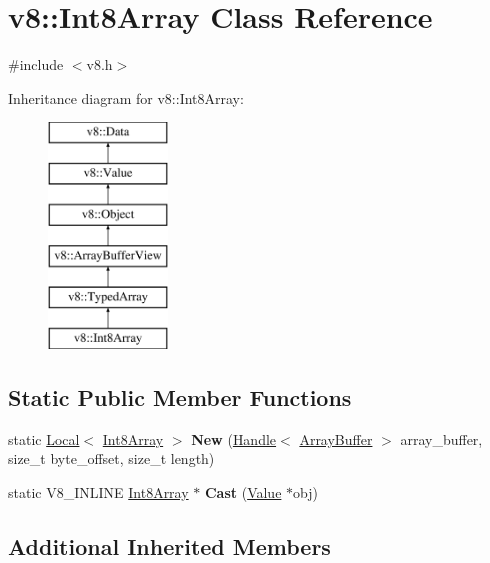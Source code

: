 \hypertarget{classv8_1_1_int8_array}{}\section{v8\+:\+:Int8\+Array Class Reference}
\label{classv8_1_1_int8_array}


{\ttfamily \#include $<$v8.\+h$>$}

Inheritance diagram for v8\+:\+:Int8\+Array\+:\begin{figure}[H]
\begin{center}
\leavevmode
\includegraphics[height=6.000000cm]{classv8_1_1_int8_array}
\end{center}
\end{figure}
\subsection*{Static Public Member Functions}
\begin{DoxyCompactItemize}
\item 
\hypertarget{classv8_1_1_int8_array_a40454c011895180c803650ba7294139b}{}static \hyperlink{classv8_1_1_local}{Local}$<$ \hyperlink{classv8_1_1_int8_array}{Int8\+Array} $>$ {\bfseries New} (\hyperlink{classv8_1_1_local}{Handle}$<$ \hyperlink{classv8_1_1_array_buffer}{Array\+Buffer} $>$ array\+\_\+buffer, size\+\_\+t byte\+\_\+offset, size\+\_\+t length)\label{classv8_1_1_int8_array_a40454c011895180c803650ba7294139b}

\item 
\hypertarget{classv8_1_1_int8_array_a201a6b46e2cc455830d62c57bc8b4a3e}{}static V8\+\_\+\+I\+N\+L\+I\+N\+E \hyperlink{classv8_1_1_int8_array}{Int8\+Array} $\ast$ {\bfseries Cast} (\hyperlink{classv8_1_1_value}{Value} $\ast$obj)\label{classv8_1_1_int8_array_a201a6b46e2cc455830d62c57bc8b4a3e}

\end{DoxyCompactItemize}
\subsection*{Additional Inherited Members}


